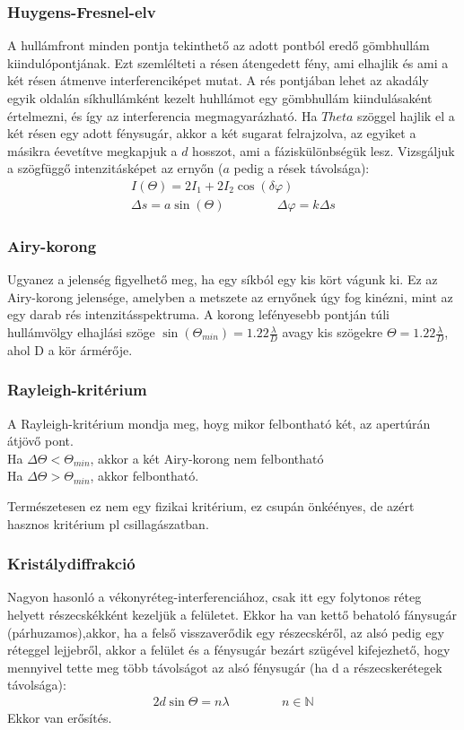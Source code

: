 \documentclass{article}
\begin{document}
\subsubsection{Huygens-Fresnel-elv}
A hullámfront minden pontja tekinthető az adott pontból eredő gömbhullám kiindulópontjának. Ezt szemlélteti a résen átengedett fény, ami elhajlik és ami a két résen átmenve interferenciképet mutat. A rés pontjában lehet az akadály egyik oldalán síkhullámként kezelt huhllámot egy gömbhullám kiindulásaként értelmezni, és így az interferencia megmagyarázható. Ha $Theta$ szöggel hajlik el a két résen egy adott fénysugár, akkor a két sugarat felrajzolva, az egyiket a másikra éevetítve megkapjuk a $d$ hosszot, ami a fáziskülönbségük lesz. Vizsgáljuk a szögfüggő intenzitásképet az ernyőn ($a$ pedig a rések távolsága):
\begin{gather*}
I(\Theta) = 2I_1 + 2I_2 \cos(\delta \varphi) \\
\Delta s = a \sin(\Theta) \hspace{50pt} \Delta \varphi = k\Delta s
\end{gather*}
\subsubsection{Airy-korong}
Ugyanez a jelenség figyelhető meg, ha egy síkból egy kis kört vágunk ki. Ez az Airy-korong jelensége, amelyben a metszete az ernyőnek úgy fog kinézni, mint az egy darab rés intenzitásspektruma. A korong lefényesebb pontján túli hullámvölgy elhajlási szöge $\sin(\Theta_{min}) = 1.22 \frac{\lambda}{D}$ avagy kis szögekre $\Theta = 1.22 \frac{\lambda}{D}$, ahol D a kör ármérője.
\subsubsection{Rayleigh-kritérium}
A Rayleigh-kritérium mondja meg, hoyg mikor felbontható két, az apertúrán átjövő pont. \\
Ha $\Delta \Theta < \Theta_{min}$, akkor a két Airy-korong nem felbontható \\
Ha $\Delta \Theta > \Theta_{min}$, akkor felbontható.

Természetesen ez nem egy fizikai kritérium, ez csupán önkéényes, de azért hasznos kritérium pl csillagászatban.
\subsubsection{Kristálydiffrakció}
Nagyon hasonló a vékonyréteg-interferenciához, csak itt egy folytonos réteg helyett részecskékként kezeljük a felületet. Ekkor ha van kettő behatoló fánysugár (párhuzamos),akkor, ha a felső visszaverődik egy részecskéről, az alsó pedig egy réteggel lejjebről, akkor a felület és a fénysugár bezárt szügével kifejezhető, hogy mennyivel tette meg több távolságot az alsó fénysugár (ha d a részecskerétegek távolsága):
\begin{gather*}
2d\sin\Theta = n\lambda \hspace{50pt} n \in \mathbb{N}
\end{gather*}
Ekkor van erősítés.
\newpage
\end{document}
